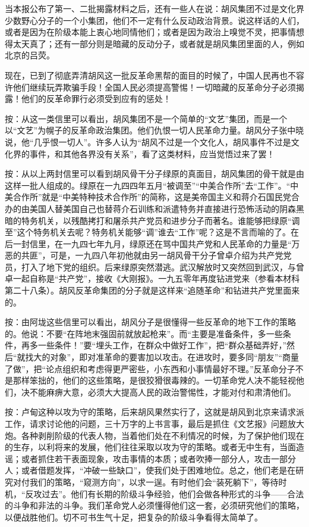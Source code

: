 当本报公布了第一、二批揭露材料之后，还有一些人在说：胡风集团不过是文化界少数野心分子的一个小集团，他们不一定有什么反动政治背景。说这样话的人们，或者是因为在阶级本能上衷心地同情他们；或者是因为政治上嗅觉不灵，把事情想得太天真了；还有一部分则是暗藏的反动分子，或者就是胡风集团里面的人，例如北京的吕荧。

现在，已到了彻底弄清胡风这一批反革命黑帮的面目的时候了，中国人民再也不容许他们继续玩弄欺骗手段！全国人民必须提高警惕！一切暗藏的反革命分子必须揭露！他们的反革命罪行必须受到应有的惩处！

按：从这一类信里可以看出，胡风集团不是一个简单的“文艺”集团，而是一个以“文艺”为幌子的反革命政治集团。他们仇恨一切人民革命力量。胡风分子张中晓说，他“几乎恨一切人”。许多人认为“胡风不过是一个文化人，胡风事件不过是文化界的事件，和其他各界没有关系”，看了这类材料，应当觉悟过来了罢！

按：从以上两封信里可以看到胡风骨干分子绿原的真面目，胡风集团的骨干就是由这样一批人组成的。绿原在一九四四年五月“被调至”“中美合作所”去“工作”。“中美合作所”就是“中美特种技术合作所”的简称，这是美帝国主义和蒋介石国民党合办的由美国人替美国自己也替蒋介石训练和派遣特务并直接进行恐怖活动的阴森黑暗的特务机关，以残酷拷打和屠杀共产党员和进步分子而著名。谁能够把绿原“调至”这个特务机关去呢？特务机关能够“调”谁去“工作”呢？这是不言而喻的了。在后一封信里，在一九四七年九月，绿原还在骂中国共产党和人民革命的力量是“万恶的共匪”，可是，一九四八年初他就由另一胡风骨干分子曾卓介绍为共产党党员，打入了地下党的组织。后来绿原突然潜逃。武汉解放时又突然回到武汉，与曾卓一起自称是“共产党”，接收《大刚报》。一九五零年再度钻进党来（参看本材科第二十八条）。胡风反革命集团的分子就是这样来“追随革命”和钻进共产党里面来的。

按：由阿垅这些信里可以看出，胡风分子是很懂得一些反革命的地下工作的策略的。他说：不要“在阵地末强固前就放起枪来”。而“主要是准备条件，多一些条件，再多一些条件！”要“埋头工作，在群众中做好工作”，把“群众基础弄好，”然后“就找大的对象”，即对准革命的要害加以攻击。在进攻时，要多同“朋友”“商量了做”，把“论点组织和考虑得更严密些，小东西和小事情最好不理。”反革命分子不是那样笨拙的，他们的这些策略，是很狡猾很毒辣的。一切革命党人决不能轻视他们，决不能麻痹大意，必须大大提高人民的政治警惕性，才能对付和肃清他们。

按：卢甸这种以攻为守的策略，后来胡风果然实行了，这就是胡风到北京来请求派工作，请求讨论他的问题，三十万字的上书言事，最后是抓住《文艺报》问题放大炮。各种剥削阶级的代表人物，当着他们处在不利情况的时候，为了保护他们现在的生存，以利将来的发展，他们往往采取以攻为守的策略。或者无中生有，当面造谣；或者抓住若干表面现象，攻击事情的本质；或者吹捧一部分人，攻击一部分人；或者借题发挥，“冲破一些缺口”，使我们处于困难地位。总之，他们老是在研究对付我们的策略，“窥测方向”，以求一逞。有时他们会“装死躺下”，等待时机，“反攻过去”。他们有长期的阶级斗争经验，他们会做各种形式的斗争——合法的斗争和非法的斗争。我们革命党人必须懂得他们这一套，必须研究他们的策略，以便战胜他们。切不可书生气十足，把复杂的阶级斗争看得太简单了。

